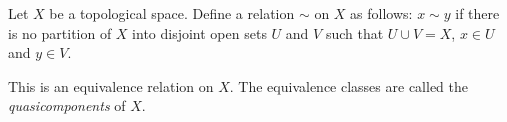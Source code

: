\documentclass{article}
\begin{document}
Let $X$ be a topological space.  Define a relation $\sim$ on $X$ as follows:  $x\sim y$ if there is no partition of $X$ into disjoint open sets $U$ and $V$ such that $U \cup V=X$, $x\in U$ and $y\in V$.

This is an equivalence relation on $X$.  The equivalence classes are called the \emph{quasicomponents} of $X$.
\end{document}
